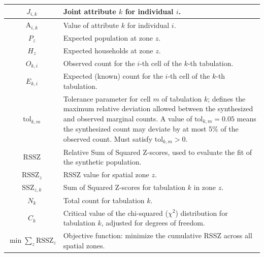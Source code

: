 \begin{longtable}{|c|p{10cm}|}
\( J_{i,k} \) & Joint attribute \( k \) for individual \( i \). \\ \hline
\( \text{A}_{i,k} \) & Value of attribute \( k \) for individual \( i \). \\ \hline
\( P_z \) & Expected population at zone \( z \). \\ \hline
\( H_z \) & Expected households at zone \( z \). \\ \hline
\( O_{k,i} \) & Observed count for the \( i \)-th cell of the \( k \)-th tabulation. \\ \hline
\( E_{k,i} \) & Expected (known) count for the \( i \)-th cell of the \( k \)-th tabulation. \\ \hline
\( \text{tol}_{k,m} \) & Tolerance parameter for cell \( m \) of tabulation \( k \); defines the maximum relative deviation allowed between the synthesized and observed marginal counts. A value of \(\text{tol}_{k,m} = 0.05\) means the synthesized count may deviate by at most 5\% of the observed count. Must satisfy \(\text{tol}_{k,m} > 0\). \\ \hline
\( \text{RSSZ} \) & Relative Sum of Squared Z-scores, used to evaluate the fit of the synthetic population. \\ \hline
\( \text{RSSZ}_z \) & RSSZ value for spatial zone \( z \). \\ \hline
\( \text{SSZ}_{z,k} \) &  Sum of Squared Z-scores for tabulation \( k \) in zone \( z \). \\ \hline
\( N_k \) & Total count for tabulation \( k \). \\ \hline
\( C_k \) & Critical value of the chi-squared (\( \chi^2 \)) distribution for tabulation \( k \), adjusted for degrees of freedom. \\ \hline
\( \min \sum_{z} \text{RSSZ}_z \) & Objective function: minimize the cumulative RSSZ across all spatial zones. \\ \hline

\end{longtable}

\FloatBarrier
